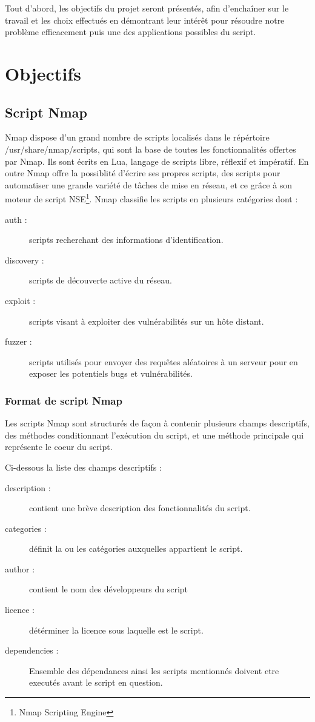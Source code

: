\documentclass[frenchb]{article}
\begin{document}
Tout d'abord, les objectifs du projet seront présentés, afin d'enchaîner sur le travail et les choix effectués en démontrant leur intérêt pour résoudre notre problème efficacement puis une des applications possibles du script.
\clearpage
\section{Objectifs}
\subsection{Script Nmap}
     Nmap dispose d'un grand nombre de scripts localisés  dans le répértoire \textsf{/usr/share/nmap/scripts}, qui sont la base de toutes les fonctionnalités offertes par Nmap. Ils  sont écrits en Lua, langage de scripts libre, réflexif et impératif.
     En outre Nmap offre la possiblité d'écrire ses propres scripts, des scripts pour automatiser une grande variété de tâches de mise en réseau, et ce grâce à son moteur de script NSE\footnote{Nmap Scripting Engine}.
 Nmap classifie les scripts en plusieurs catégories dont : 

 \begin{description}
 \item[auth :] scripts recherchant des informations d'identification.
 \item[discovery :] scripts de découverte active du réseau.
 \item[exploit :] scripts visant à exploiter des vulnérabilités sur un hôte distant.
 \item[fuzzer :] scripts utilisés pour envoyer des requêtes aléatoires à un serveur pour en exposer les potentiels bugs et vulnérabilités.
\end{description}

\subsubsection*{Format de script Nmap}

Les scripts Nmap sont structurés de façon à contenir plusieurs champs descriptifs, des méthodes conditionnant l'exécution du script, et une méthode principale qui représente le coeur du script.

Ci-dessous la liste des champs descriptifs :
\begin{description}
\item[description :] contient une brève description des fonctionnalités du script.
\item[categories :]  définit la ou les catégories auxquelles appartient le script.
\item[author :] contient le nom des développeurs du script
\item[licence :] détérminer la licence sous laquelle est le script.
\item[dependencies :] Ensemble des dépendances ainsi les scripts mentionnés doivent etre executés avant le script en question.
\end{description}
\end{document}
